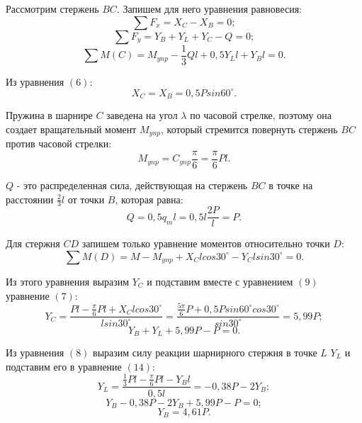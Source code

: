 \documentclass{article}
\begin{document}
Рассмотрим стержень $BC$. Запишем для него уравнения равновесия:
\begin{equation}
\sum F_x = X_C - X_B = 0;
\end{equation}
\begin{equation}
\sum F_y = Y_B + Y_L+Y_C - Q = 0;
\end{equation}
\begin{equation}
\sum M(C) = M_{ynp} - \frac{1}{3}Ql + 0,5Y_Ll + Y_Bl = 0.
\end{equation}

Из уравнения $(6)$:
\begin{equation}
X_C = X_B = 0,5Psin60^\circ.
\end{equation}

Пружина в шарнире $C$ заведена на угол $\lambda$ по часовой стрелке, поэтому она создает вращательный момент $M_{ynp}$, который стремится повернуть стержень $BC$ против часовой стрелки:
\begin{equation}
M_{ynp} = C_{ynp}\frac{\pi}{6} = \frac{\pi}{6}Pl.
\end{equation}

$Q$ - это распределенная сила, действующая на стержень $BC$ в точке на расстоянии $\frac{2}{3}l$ от точки $B$, которая равна:
\begin{equation}
Q = 0,5q_ml = 0,5l\frac{2P}{l} = P.
\end{equation}

Для стержня $CD$ запишем только уравнение моментов относительно точки $D$:
\begin{equation}
\sum M(D) = M - M_{ynp} + X_Clcos30^\circ - Y_Clsin30^\circ = 0.
\end{equation}

Из этого уравнения выразим $Y_C$ и подставим вместе с уравнением $(9)$ уравнение $(7)$:
\begin{equation}
Y_C = \frac{Pl - \frac{\pi}{6}Pl + X_Clcos30^\circ}{lsin30^\circ} = \frac{\frac{5\pi}{6}P + 0,5Psin60^\circ cos30^\circ}{sin 30^\circ} = 5,99P;
\end{equation}
\begin{equation}
Y_B + Y_L +5,99P -P = 0.
\end{equation}

Из уравнения $(8)$ выразим силу реакции шарнирного стержня в точке $L$ $Y_L$ и подставим его в уравнение $(14)$:
\begin{equation}
Y_L = \frac{\frac{1}{3}Pl - \frac{\pi}{6}Pl - Y_Bl}{0,5l} = -0,38P -2Y_B;
\end{equation}
\begin{equation}
Y_B - 0,38P - 2Y_B +5,99P -P = 0;
\end{equation}
\begin{equation}
Y_B = 4,61P.
\end{equation}
\end{document}
